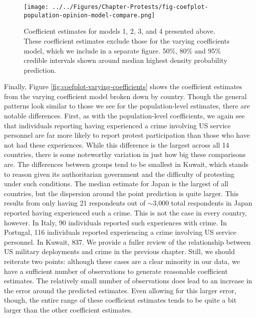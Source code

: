 			
			\begin{figure}[t]
				\centering\texttt{[image: ../../Figures/Chapter-Protests/fig-coefplot-population-opinion-model-compare.png]}
				\caption{Coefficient estimates for models 1, 2, 3, and 4 presented above. These coefficient estimates exclude those for the varying coefficients model, which we include in a separate figure. 50\%, 80\% and 95\% credible intervals shown around median highest density probability prediction.}
				\label{fig:coefplot-population-compare}
			\end{figure}
			
			Finally, Figure \ref{fig:coefplot-varying-coefficients} shows the coefficient estimates from the varying coefficient model broken down by country. Though the general patterns look similar to those we see for the population-level estimates, there are notable differences. First, as with the population-level coefficients, we again see that individuals reporting having experienced a crime involving US service personnel are far more likely to report protest participation than those who have not had these experiences. While this difference is the largest across all 14 countries, there is some noteworthy variation in just how big these comparisons are. The differences between groups tend to be smallest in Kuwait, which stands to reason given its authoritarian government and the difficulty of protesting under such conditions.  The median estimate for Japan is the largest of all countries, but the dispersion around the point prediction is quite larger. This results from only having 21 respondents out of $\sim$3,000 total respondents in Japan reported having experienced such a crime. This is not the case in every country, however. In Italy, 90 individuals reported such experiences with crime. In Portugal, 116 individuals reported experiencing a crime involving US service personnel. In Kuwait, 837. We provide a fuller review of the relationship between US military deployments and crime in the previous chapter. Still, we should reiterate two points: although these cases are a clear minority in our data, we have a sufficient number of observations to generate reasonable coefficient estimates. The relatively small number of observations does lead to an increase in the error around the predicted estimates. Even allowing for this larger error, though, the entire range of these coefficient estimates tends to be quite a bit larger than the other coefficient estimates. 
			
